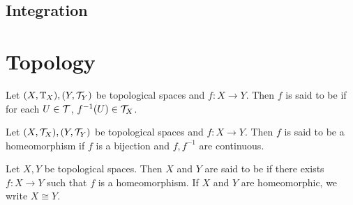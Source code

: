 \documentclass{book}
\begin{document}
	
	
	
	
	
	
	
	
	
	
	
	
	
	
	
	
	
	
	
	
	
	
	
	
	
	
	
	
	
	
	
	
	
	
	
	
	
	
	
	
	
	
	
	\newpage
	
	\subsection{Integration}














\newpage
\section{Topology}

\begin{defn}
Let $(X, \mathbb{T}_X), (Y, \mathcal{T}_Y)$ be topological spaces and $f:X\rightarrow Y$. Then $f$ is said to be  if for each $U \in \mathcal{T}$, $f^{-1}(U) \in \mathcal{T}_X$.
\end{defn}

\begin{defn}
Let $(X, \mathcal{T}_X), (Y, \mathcal{T}_Y)$ be topological spaces and $f:X\rightarrow Y$. Then $f$ is said to be a homeomorphism if $f$ is a bijection and $f, f^{-1}$ are continuous. 
\end{defn}

\begin{defn}
Let $X, Y$ be topological spaces. Then $X$ and $Y$ are said to be  if there exists $f:X \rightarrow Y$ such that $f$ is a homeomorphism. If $X$ and $Y$ are homeomorphic, we write $X \cong Y$. 
\end{defn}
\end{document}

